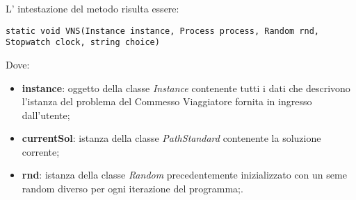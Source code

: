 L' intestazione del metodo risulta essere:

\begin{lstlisting}
static void VNS(Instance instance, Process process, Random rnd, Stopwatch clock, string choice)
\end{lstlisting}

Dove:

\begin{itemize}
    \item \textbf{instance}: oggetto della classe \textit{Instance} contenente tutti i dati che descrivono l'istanza del problema del Commesso Viaggiatore fornita in ingresso dall'utente;
    \item \textbf{currentSol}: istanza della classe \textit{PathStandard} contenente la soluzione corrente;
    \item \textbf{rnd}: istanza della classe \textit{Random} precedentemente inizializzato con un seme random diverso per ogni iterazione del programma;.
\end{itemize}

